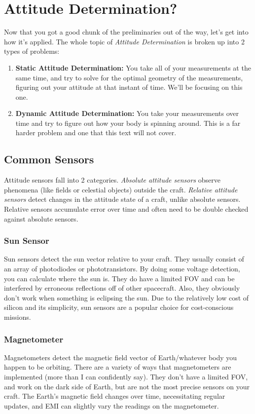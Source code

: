 \documentclass[a4paper,14pt]{extreport}
\begin{document}
\chapter{Attitude Determination?}
Now that you got a good chunk of the preliminaries out of the way, let's get into how it's applied. The whole topic of \emph{Attitude Determination} is broken up into 2 types of problems:
\begin{enumerate}
\item{
\textbf{Static Attitude Determination:} You take all of your measurements at the same time, and try to solve for the optimal geometry of the measurements, figuring out your attitude at that instant of time. We'll be focusing on this one.
}
\item{\textbf{Dynamic Attitude Determination:} You take your measurements over time and try to figure out how your body is spinning around. This is a far harder problem and one that this text will not cover.
}
\end{enumerate}

\section{Common Sensors}
Attitude sensors fall into 2 categories. \emph{Absolute attitude sensors} observe phenomena (like fields or celestial objects) outside the craft. \emph{Relative attitude sensors} detect changes in the attitude state of a craft, unlike absolute sensors. Relative sensors accumulate error over time and often need to be double checked against absolute sensors.
\subsection{Sun Sensor}
Sun sensors detect the sun vector relative to your craft. They usually consist of an array of photodiodes or phototransistors. By doing some voltage detection, you can calculate where the sun is. They do have a limited FOV and can be interfered by erroneous reflections off of other spacecraft. Also, they obviously don't work when something is eclipsing the sun. Due to the relatively low cost of silicon and its simplicity, sun sensors are a popular choice for cost-conscious missions.
\subsection{Magnetometer}
Magnetometers detect the magnetic field vector of Earth/whatever body you happen to be orbiting. There are a variety of ways that magnetometers are implemented (more than I can confidently say). They don't have a limited FOV, and work on the dark side of Earth, but are not the most precise sensors on your craft. The Earth's magnetic field changes over time, necessitating regular updates, and EMI can slightly vary the readings on the magnetometer.
\end{document}

